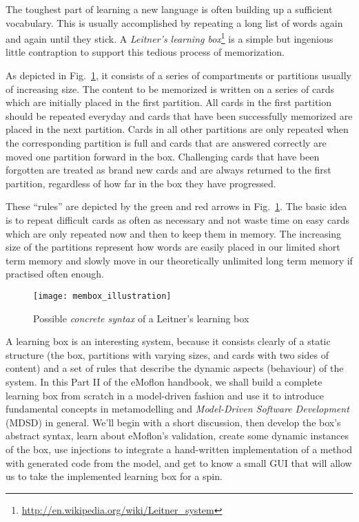 \genHeader


The toughest part of learning a new language  is often building up a sufficient vocabulary. This is usually accomplished by repeating a long list of words again
and again until they stick. A \emph{Leitner's learning box}\footnote{\url{http://en.wikipedia.org/wiki/Leitner_system}} is a simple but ingenious little
contraption to support this tedious process of memorization.

As depicted in Fig.~\ref{fig:membox_illustration}, it consists of a series of compartments or partitions usually of increasing size. The content to be memorized
is written on a series of cards  which are initially placed in the first partition. All cards in the first  partition should be repeated everyday and cards that
have been successfully memorized are placed in the next partition. Cards in all other partitions are only repeated when the corresponding partition is full and
cards that are answered correctly are moved one partition forward in the box. Challenging cards that have been forgotten are treated as brand new cards and
are always returned to the first partition, regardless of how far in the box they have progressed.

These ``rules'' are depicted by the green and red arrows in Fig.~\ref{fig:membox_illustration}. The basic idea is to repeat difficult cards as often as
necessary and not waste time on easy cards which are only repeated now and then to keep them in memory. The increasing size of the partitions represent how
words are easily placed in our limited short term memory and slowly move in our theoretically unlimited long term memory if practised often enough.

 \begin{figure}[htp]
 \begin{center}
   \texttt{[image: membox\_illustration]}
   \caption[]{Possible \emph{concrete syntax} of a Leitner's learning box}
   \label{fig:membox_illustration}
 \end{center}
 \end{figure}
 \FloatBarrier

A learning box is an interesting system, because it consists clearly of a static structure (the box, partitions with varying sizes, and cards with two sides
of content) and a set of rules that describe the dynamic aspects (behaviour) of the system. In this Part II of the eMoflon handbook,
we shall build a complete learning box from scratch in a model-driven fashion and use it to introduce fundamental concepts in metamodelling and \emph{Model-Driven Software 
Development} (MDSD) in general. We'll begin with a short discussion, then develop the box's abstract syntax, learn about eMoflon's validation, create
some dynamic instances of the box, use injections to integrate a hand-written implementation of a method with generated code from the model, and get to know a
small GUI that will allow us to take the implemented learning box for a spin.
